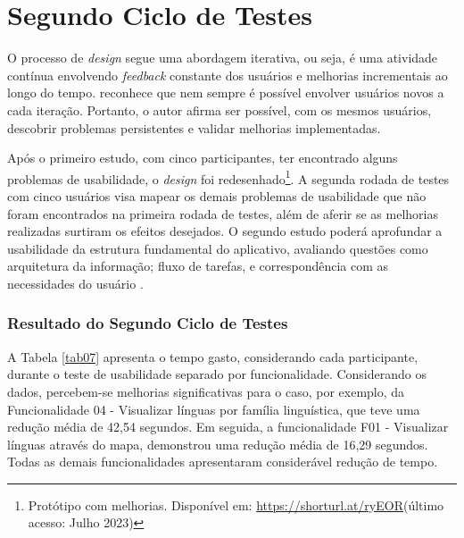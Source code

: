 \section{Segundo Ciclo de Testes}
\label{sec:Segundo Ciclo}
O processo de \textit{design} segue uma abordagem iterativa, ou seja, é uma atividade contínua envolvendo \textit{feedback} constante dos usuários e melhorias incrementais ao longo do tempo.  
reconhece que nem sempre é possível envolver usuários novos a cada iteração. Portanto, o autor afirma ser possível, com os mesmos usuários, descobrir problemas persistentes e validar melhorias implementadas. 

Após o primeiro estudo, com cinco participantes, ter encontrado alguns problemas de usabilidade, o \textit{design} foi redesenhado\footnote{Protótipo com melhorias. Disponível em: \url{https://shorturl.at/ryEOR}(último acesso: Julho 2023)}. 
A segunda rodada de testes com cinco usuários visa mapear os demais problemas de usabilidade que não foram encontrados na primeira rodada de testes, além de aferir se as melhorias realizadas surtiram os efeitos desejados. O segundo estudo poderá aprofundar a 
usabilidade da estrutura fundamental do aplicativo, avaliando questões como arquitetura da informação; fluxo de tarefas, e correspondência com as necessidades do usuário \cite{usabilitytest}.

\subsubsection{Resultado do Segundo Ciclo de Testes}
\label{sec:Resultado do Segundo Ciclo de Testes}
A Tabela \ref{tab07} apresenta o tempo gasto, considerando cada participante, durante o teste de usabilidade separado por funcionalidade. Considerando os dados, percebem-se melhorias significativas para o caso, por exemplo, da Funcionalidade 04 - Visualizar línguas 
por família linguística, que teve uma redução média de 42,54 segundos. Em seguida, a funcionalidade F01 - Visualizar línguas através do mapa, demonstrou uma redução média de 16,29 segundos. Todas as demais funcionalidades apresentaram considerável redução de 
tempo. 

